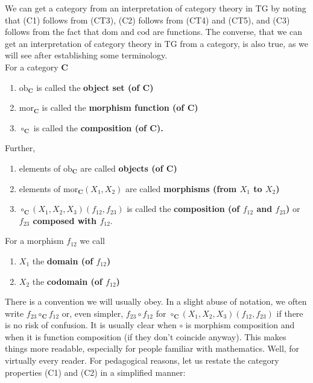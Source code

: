 We can get a category from an interpretation of category theory in TG by noting that (C1) follows from (CT3), (C2) follows from (CT4) and (CT5), and (C3) follows from the fact that $\mathrm{dom}$ and $\mathrm{cod}$ are functions.
The converse, that we can get an interpretation of category theory in TG from a category, is also true, as we will see after establishing some terminology.
\\
For a category $\mathbf{C}$
\begin{enumerate}
\item[$\bullet$]
$\mathrm{ob}_{\mathbf{C}}$ is called the \textbf{object set (of $\mathbf{C}$)}
\item[$\bullet$]
$\mathrm{mor}_{\mathbf{C}}$ is called the \textbf{morphism function (of $\mathbf{C}$)}
\item[$\bullet$]
$\circ_{\mathbf{C}}$ is called the \textbf{composition (of $\mathbf{C}$).}
\end{enumerate}
Further,
\begin{enumerate}
\item[$\bullet$]
elements of $\mathrm{ob}_{\mathbf{C}}$ are called \textbf{objects (of $\mathbf{C}$)}
\item[$\bullet$]
elements of $\mathrm{mor}_{\mathbf{C}}(X_{1},X_{2})$ are called \textbf{morphisms (from $X_{1}$ to $X_{2}$)}
\item[$\bullet$]
$\circ_{\mathbf{C}}(X_{1},X_{2},X_{3})(f_{12},f_{23})$ is called the \textbf{composition (of $f_{12}$ and $f_{23}$)} or \textbf{$f_{23}$ composed with $f_{12}$}.
\end{enumerate}
For a morphism $f_{12}$ we call
\begin{enumerate}
\item[$\bullet$]
$X_{1}$ the \textbf{domain (of $f_{12}$)}
\item[$\bullet$]
$X_{2}$ the \textbf{codomain (of $f_{12}$)}
\end{enumerate}
There is a convention we will usually obey.
In a slight abuse of notation, we often write $f_{23} \circ_{\mathbf{C}} f_{12}$ or, even simpler, $f_{23} \circ f_{12}$ for $\circ_{\mathbf{C}}(X_{1},X_{2},X_{3})(f_{12},f_{23})$ if there is no risk of confusion.
It is usually clear when $\circ$ is morphism composition and when it is function composition (if they don't coincide anyway).
This makes things more readable, especially for people familiar with mathematics.
Well, for virtually every reader.
For pedagogical reasons, let us restate the category properties (C1) and (C2) in a simplified manner:
